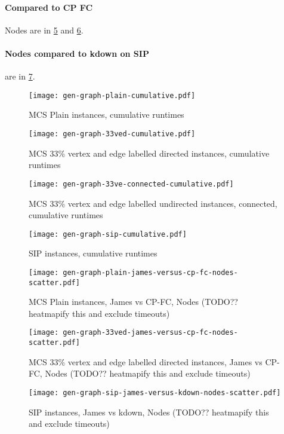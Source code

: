 \documentclass[letterpaper]{article}
\begin{document}
\paragraph{Compared to CP FC} Nodes are in \cref{figure:plain-james-versus-cp-fc-nodes-scatter} and \cref{figure:33ved-james-versus-cp-fc-nodes-scatter}.

\paragraph{Nodes compared to kdown on SIP} are in \cref{figure:sip-james-versus-kdown-nodes-scatter}.

\begin{figure}
    \centering
    \texttt{[image: gen-graph-plain-cumulative.pdf]}
    \caption{MCS Plain instances, cumulative runtimes}\label{figure:plain-cumulative}
\end{figure}

\begin{figure}
    \centering
    \texttt{[image: gen-graph-33ved-cumulative.pdf]}
    \caption{MCS 33\% vertex and edge labelled directed instances, cumulative runtimes}\label{figure:33ved-cumulative}
\end{figure}

\begin{figure}
    \centering
    \texttt{[image: gen-graph-33ve-connected-cumulative.pdf]}
    \caption{MCS 33\% vertex and edge labelled undirected instances, connected, cumulative runtimes}\label{figure:33ve-connected-cumulative}
\end{figure}

\begin{figure}
    \centering
    \texttt{[image: gen-graph-sip-cumulative.pdf]}
    \caption{SIP instances, cumulative runtimes}\label{figure:sip-cumulative}
\end{figure}

\begin{figure}
    \centering
    \texttt{[image: gen-graph-plain-james-versus-cp-fc-nodes-scatter.pdf]}
    \caption{MCS Plain instances, James vs CP-FC, Nodes (TODO?? heatmapify this
    and exclude timeouts)}\label{figure:plain-james-versus-cp-fc-nodes-scatter}
\end{figure}

\begin{figure}
    \centering
    \texttt{[image: gen-graph-33ved-james-versus-cp-fc-nodes-scatter.pdf]}
    \caption{MCS 33\% vertex and edge labelled directed instances, James vs
    CP-FC, Nodes (TODO?? heatmapify this and exclude
    timeouts)}\label{figure:33ved-james-versus-cp-fc-nodes-scatter}
\end{figure}

\begin{figure}
    \centering
    \texttt{[image: gen-graph-sip-james-versus-kdown-nodes-scatter.pdf]}
    \caption{SIP instances, James vs kdown, Nodes (TODO?? heatmapify this and exclude
    timeouts)}\label{figure:sip-james-versus-kdown-nodes-scatter}
\end{figure}



\end{document}
